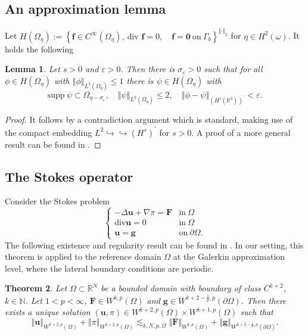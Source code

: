 \documentclass[10pt,a4paper]{article}
\newtheorem{theorem}{Theorem}[section]
\newtheorem{lemma}[theorem]{Lemma}
\numberwithin{equation}{section}
\begin{document}
\subsection{An approximation lemma}
  Let  
$H\left(\Omega_{\eta}\right):=\left\{ \mathbf{f}\in C^{\infty}\left(\Omega_{\eta}\right),\ \text{div }\mathbf{f}=0,\quad\mathbf{f}=\mathbf{0}\ \text{on}\ \Gamma_{b}\right\} ^{\left\Vert \cdot\right\Vert _{2}}$ for $\eta \in H^{2}(\omega)$. It holds the following
\begin{lemma}\label{lemma:approx-dual-appendix}
Let $s>0$ and $\varepsilon>0$. Then there is $\sigma_{\varepsilon}>0$ such that for all $\phi \in H(\Omega_{\eta})$ with $\left\Vert \phi\right\Vert _{L^{2}\left(\Omega_{\eta}\right)}\le1$ there is $\psi\in H\left(\Omega_{\eta}\right)$ with 
\[\text{supp} \ \psi\subset\Omega_{\eta-\sigma_{\varepsilon}},\quad\left\Vert \psi\right\Vert _{L^{2}\left(\Omega_{\eta}\right)}\le2,\quad\left\Vert \phi-\psi\right\Vert _{\left(H^{s}\left(\mathbb{R}^{3}\right)\right)^{\prime}}<\varepsilon.\]
\end{lemma}
\begin{proof}
    It follows by a contradiction argument which is standard, making use of the compact embedding $L^{2}\hookrightarrow\hookrightarrow\left(H^{s}\right)^{\prime}$ for $s>0$. A proof of a more general result can be found in \cite[Lemma A13]{LR14}.
\end{proof}
\subsection{The Stokes operator}
Consider the Stokes problem 
\begin{equation}\label{eqn:chap05-Stokes}
\begin{cases}
-\Delta\mathbf{u}+\nabla\pi=\mathbf{F} & \text{in}\ \Omega\\
\text{div}\mathbf{u}=0 & \text{in}\ \Omega\\
\mathbf{u}=\mathbf{g} & \text{on}\ \partial\Omega.
\end{cases}
\end{equation}
The following existence and regularity result can be found in \cite{Galdi-book}. In our setting, this theorem is applied to the reference domain $\Omega$ at the Galerkin approximation level, where the lateral boundary conditions are periodic.
\begin{theorem}\label{chap05-thm-Stokes-reg}
Let $\Omega \subset \mathbb{R}^{N}$ be a bounded domain with boundary of class $C^{k+2}$,  $k \in \mathbb{N}$. Let $1<p<\infty$, $\mathbf{F}\in W^{k,p}(\Omega)$ and $\mathbf{g}\in W^{k+2-\frac{1}{p},p}(\partial\Omega)$. Then there exists a unique solution $\left(\mathbf{u},\pi\right)\in W^{k+2,p}\left(\Omega\right)\times W^{k+1,p}\left(\Omega\right)$ such that 
\[
\left\Vert \mathbf{u}\right\Vert _{W^{k+2,p}\left(\Omega\right)}+\left\Vert \pi\right\Vert _{W^{k+2,p}\left(\Omega\right)}\lesssim_{k,N,p,\Omega}\left\Vert \mathbf{F}\right\Vert _{W^{k,p}\left(\Omega\right)}+\left\Vert \mathbf{g}\right\Vert _{W^{k+2-\frac{1}{p},p}\left(\partial\Omega\right)}.
\]

\end{theorem}
\end{document}
